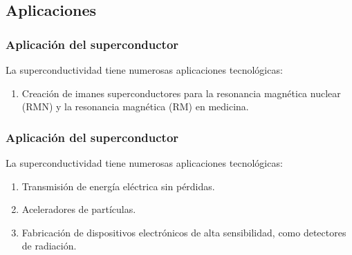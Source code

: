 \documentclass[14pt]{beamer}
\begin{document}
\subsection{Aplicaciones}

\begin{frame}
\frametitle{Aplicación del superconductor}
La superconductividad tiene numerosas aplicaciones tecnológicas:
\pause
{}
\begin{enumerate}[<+->]
\item Creación de imanes superconductores para la resonancia magnética nuclear (RMN) y la resonancia magnética (RM) en medicina.
\seti
\end{enumerate}
\end{frame}
\begin{frame}
\frametitle{Aplicación del superconductor}
La superconductividad tiene numerosas aplicaciones tecnológicas:
\pause
{}
\begin{enumerate}[<+->]
\conti
\item Transmisión de energía eléctrica sin pérdidas.
\item Aceleradores de partículas.
\item Fabricación de dispositivos electrónicos de alta sensibilidad, como detectores de radiación.
\end{enumerate}
\end{frame}
\end{document}
